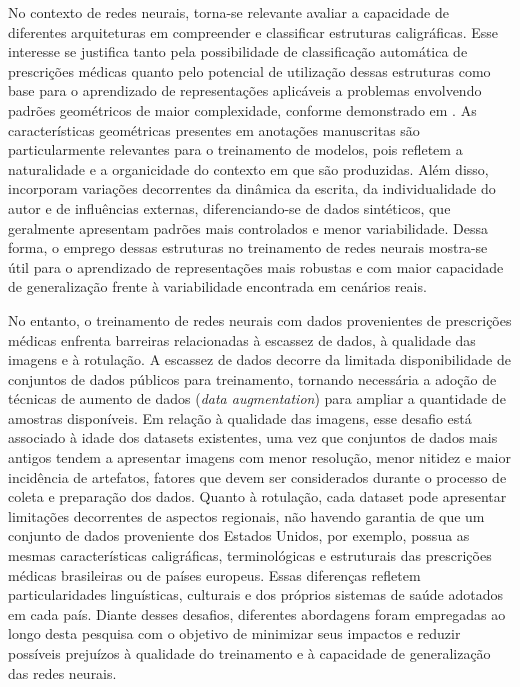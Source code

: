\documentclass[11pt,a4paper]{article}
\begin{document}
No contexto de redes neurais, torna-se relevante avaliar a capacidade de diferentes arquiteturas em compreender e classificar estruturas caligráficas. Esse interesse se justifica tanto pela possibilidade de classificação automática de prescrições médicas quanto pelo potencial de utilização dessas estruturas como base para o aprendizado de representações aplicáveis a problemas envolvendo padrões geométricos de maior complexidade, conforme demonstrado em \cite{ali2024leveraging}. As características geométricas presentes em anotações manuscritas são particularmente relevantes para o treinamento de modelos, pois refletem a naturalidade e a organicidade do contexto em que são produzidas. Além disso, incorporam variações decorrentes da dinâmica da escrita, da individualidade do autor e de influências externas, diferenciando-se de dados sintéticos, que geralmente apresentam padrões mais controlados e menor variabilidade. Dessa forma, o emprego dessas estruturas no treinamento de redes neurais mostra-se útil para o aprendizado de representações mais robustas e com maior capacidade de generalização frente à variabilidade encontrada em cenários reais.



No entanto, o treinamento de redes neurais com dados provenientes de prescrições médicas enfrenta barreiras relacionadas à escassez de dados, à qualidade das imagens e à rotulação. A escassez de dados decorre da limitada disponibilidade de conjuntos de dados públicos para treinamento, tornando necessária a adoção de técnicas de aumento de dados (\textit{data augmentation}) para ampliar a quantidade de amostras disponíveis. Em relação à qualidade das imagens, esse desafio está associado à idade dos datasets existentes, uma vez que conjuntos de dados mais antigos tendem a apresentar imagens com menor resolução, menor nitidez e maior incidência de artefatos, fatores que devem ser considerados durante o processo de coleta e preparação dos dados. Quanto à rotulação, cada dataset pode apresentar limitações decorrentes de aspectos regionais, não havendo garantia de que um conjunto de dados proveniente dos Estados Unidos, por exemplo, possua as mesmas características caligráficas, terminológicas e estruturais das prescrições médicas brasileiras ou de países europeus. Essas diferenças refletem particularidades linguísticas, culturais e dos próprios sistemas de saúde adotados em cada país. Diante desses desafios, diferentes abordagens foram empregadas ao longo desta pesquisa com o objetivo de minimizar seus impactos e reduzir possíveis prejuízos à qualidade do treinamento e à capacidade de generalização das redes neurais.
\end{document}
